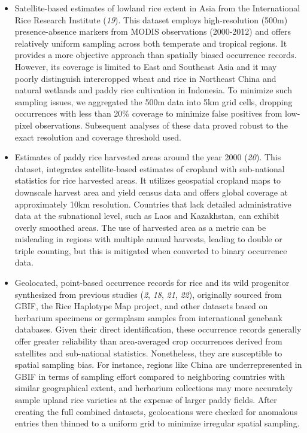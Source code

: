 \documentclass[
  letterpaper,
  DIV=11,
  numbers=noendperiod]{scrartcl}
\begin{document}
\begin{itemize}
\item
  Satellite-based estimates of lowland rice extent in Asia from the
  International Rice Research Institute (\emph{19}). This dataset
  employs high-resolution (500m) presence-absence markers from MODIS
  observations (2000-2012) and offers relatively uniform sampling across
  both temperate and tropical regions. It provides a more objective
  approach than spatially biased occurrence records. However, its
  coverage is limited to East and Southeast Asia and it may poorly
  distinguish intercropped wheat and rice in Northeast China and natural
  wetlands and paddy rice cultivation in Indonesia. To minimize such
  sampling issues, we aggregated the 500m data into 5km grid cells,
  dropping occurrences with less than 20\% coverage to minimize false
  positives from low-pixel observations. Subsequent analyses of these
  data proved robust to the exact resolution and coverage threshold
  used.
\item
  Estimates of paddy rice harvested areas around the year 2000
  (\emph{20}). This dataset, integrates satellite-based estimates of
  cropland with sub-national statistics for rice harvested areas. It
  utilizes geospatial cropland maps to downscale harvest area and yield
  census data and offers global coverage at approximately 10km
  resolution. Countries that lack detailed administrative data at the
  subnational level, such as Laos and Kazakhstan, can exhibit overly
  smoothed areas. The use of harvested area as a metric can be
  misleading in regions with multiple annual harvests, leading to double
  or triple counting, but this is mitigated when converted to binary
  occurrence data.
\item
  Geolocated, point-based occurrence records for rice and its wild
  progenitor synthesized from previous studies (\emph{2}, \emph{18},
  \emph{21}, \emph{22}), originally sourced from GBIF, the Rice
  Haplotype Map project, and other datasets based on herbarium specimens
  or germplasm samples from international genebank databases. Given
  their direct identification, these occurrence records generally offer
  greater reliability than area-averaged crop occurrences derived from
  satellites and sub-national statistics. Nonetheless, they are
  susceptible to spatial sampling bias. For instance, regions like China
  are underrepresented in GBIF in terms of sampling effort compared to
  neighboring countries with similar geographical extent, and herbarium
  collections may more accurately sample upland rice varieties at the
  expense of larger paddy fields. After creating the full combined
  datasets, geolocations were checked for anomalous entries then thinned
  to a uniform grid to minimize irregular spatial sampling.
\end{itemize}
\end{document}
